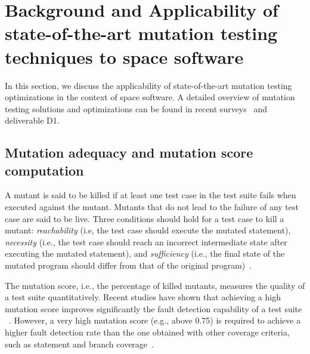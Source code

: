
\section{Background and Applicability of state-of-the-art mutation testing techniques to space software}
\label{sec:background}

In this section, we discuss the applicability of state-of-the-art mutation testing optimizations in the context of space software. A detailed overview of mutation testing solutions and optimizations can be found in recent surveys~\cite{jia2010analysis,papadakis2019mutation} and deliverable D1.

\subsection{Mutation adequacy and mutation score computation}
\label{background:adequacy}
A mutant is said to be killed if at least one test case in the test suite fails when executed against the mutant.
Mutants that do not lead to the failure of any test case are said to be live.
Three conditions should hold for a test case to kill a mutant: \emph{reachability} (i.e, the test case should execute the mutated statement), \emph{necessity} (i.e., the test case should reach an incorrect intermediate state after executing the mutated statement), and \emph{sufficiency} (i.e., the final state of the mutated program should differ from that of the original program)~\cite{offutt1997automatically}.

The mutation score, i.e., the percentage of killed mutants, measures the quality of a test suite quantitatively. Recent studies have shown that achieving a high mutation score improves significantly the fault detection capability of a test suite
~\cite{papadakis2018mutation}. 
However, a very high mutation score (e.g., above 0.75) is required to achieve a higher fault detection rate than the one obtained with other coverage criteria, such as statement and branch coverage~\cite{Chekam:17}.

